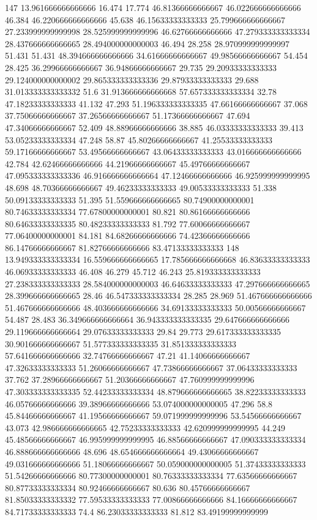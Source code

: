 147 13.961666666666666 16.474 17.774 46.81366666666667 46.022666666666666 46.384 46.220666666666666 45.638 46.15633333333333 25.799666666666667 27.233999999999998 28.525999999999996 46.62766666666666 47.279333333333334 28.437666666666665 28.494000000000003 46.494 28.258 28.970999999999997 51.431 51.431 48.394666666666666 34.61666666666667 49.98566666666667 54.454 28.425 36.29966666666667 36.94866666666667 29.735 29.20933333333333 29.124000000000002 29.865333333333336 29.87933333333333 29.688 31.013333333333332 51.6 31.913666666666668 57.657333333333334 32.78 47.18233333333333 41.132 47.293 51.196333333333335 47.66166666666667 37.068 37.75066666666667 37.26566666666667 51.17366666666667 47.694 47.34066666666667 52.409 48.88966666666666 38.885 46.03333333333333 39.413 53.05233333333334 47.248 58.87 45.80266666666667 41.25533333333333 59.17166666666667 53.49566666666667 43.06433333333333 43.016666666666666 42.784 42.62466666666666 44.21966666666667 45.49766666666667 47.095333333333336 46.916666666666664 47.12466666666666 46.925999999999995 48.698 48.70366666666667 49.46233333333333 49.00533333333333 51.338 50.09133333333333 51.395 51.559666666666665 80.74900000000001 80.74633333333334 77.67800000000001 80.821 80.86166666666666 80.64633333333335 80.48233333333333 81.792 77.60066666666667 77.06400000000001 84.181 84.68266666666666 74.42366666666666 86.14766666666667 81.82766666666666 83.47133333333333
148 13.949333333333334 16.559666666666665 17.785666666666668 46.83633333333333 46.06933333333333 46.408 46.279 45.712 46.243 25.819333333333333 27.238333333333333 28.584000000000003 46.64633333333333 47.297666666666665 28.399666666666665 28.46 46.547333333333334 28.285 28.969 51.467666666666666 51.467666666666666 48.403666666666666 34.69133333333333 50.00566666666667 54.487 28.483 36.349666666666664 36.943333333333335 29.647666666666666 29.119666666666664 29.07633333333333 29.84 29.773 29.617333333333335 30.901666666666667 51.577333333333335 31.851333333333333 57.641666666666666 32.74766666666667 47.21 41.14066666666667 47.32633333333333 51.26066666666667 47.73866666666667 37.06433333333333 37.762 37.28966666666667 51.20366666666667 47.760999999999996 47.303333333333335 52.44233333333334 48.879666666666665 38.82233333333333 46.05766666666666 39.38966666666666 53.074000000000005 47.296 58.8 45.84466666666667 41.19566666666667 59.071999999999996 53.54566666666667 43.073 42.986666666666665 42.75233333333333 42.620999999999995 44.249 45.48566666666667 46.995999999999995 46.88566666666667 47.090333333333334 46.888666666666666 48.696 48.654666666666664 49.43066666666667 49.031666666666666 51.18066666666667 50.059000000000005 51.37433333333333 51.54266666666666 80.77300000000001 80.76333333333334 77.63566666666667 80.87733333333334 80.92466666666667 80.636 80.45766666666667 81.85033333333332 77.59533333333333 77.00866666666666 84.16666666666667 84.71733333333333 74.4 86.23033333333333 81.812 83.49199999999999
